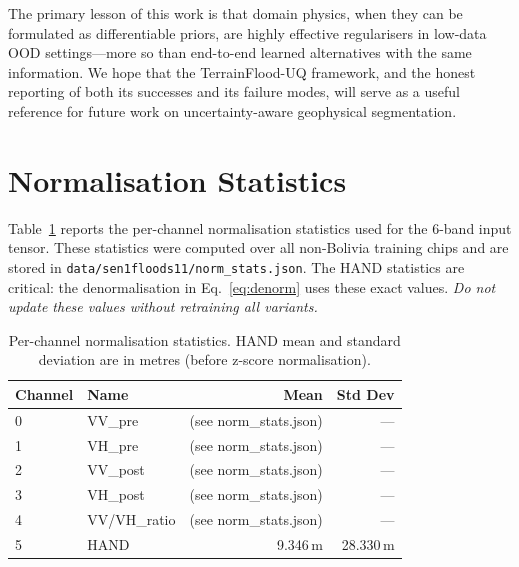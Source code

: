 \documentclass[12pt]{article}
\begin{document}
The primary lesson of this work is that domain physics, when they can be
formulated as differentiable priors, are highly effective regularisers in
low-data OOD settings—more so than end-to-end learned alternatives with the
same information.  We hope that the TerrainFlood-UQ framework, and the
honest reporting of both its successes and its failure modes, will serve as a
useful reference for future work on uncertainty-aware geophysical segmentation.

\newpage


\newpage
\appendix
\renewcommand{\thesection}{\Alph{section}}

\section{Normalisation Statistics}
\label{app:norm}

Table~\ref{tab:norm_stats} reports the per-channel normalisation statistics
used for the 6-band input tensor.  These statistics were computed over all
non-Bolivia training chips and are stored in \texttt{data/sen1floods11/norm\_stats.json}.
The HAND statistics are critical: the denormalisation in Eq.~\ref{eq:denorm}
uses these exact values.  \emph{Do not update these values without retraining
all variants.}

\begin{table}[h]
\centering
\caption{Per-channel normalisation statistics.  HAND mean and standard deviation
are in metres (before z-score normalisation).}
\label{tab:norm_stats}
\begin{tabular}{llrr}
\toprule
\textbf{Channel} & \textbf{Name} & \textbf{Mean} & \textbf{Std Dev} \\
\midrule
0 & VV\_pre        & (see norm\_stats.json) & — \\
1 & VH\_pre        & (see norm\_stats.json) & — \\
2 & VV\_post       & (see norm\_stats.json) & — \\
3 & VH\_post       & (see norm\_stats.json) & — \\
4 & VV/VH\_ratio   & (see norm\_stats.json) & — \\
5 & HAND           & 9.346\,m              & 28.330\,m \\
\bottomrule
\end{tabular}
\end{table}
\end{document}
